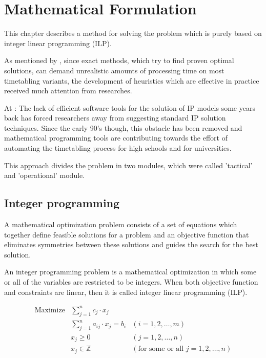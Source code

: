 \chapter{Mathematical Formulation}
\label{chap:mipformulation}



This chapter describes a method for solving the problem which is purely based on integer linear programming (ILP).

As mentioned by \cite{Haroldo2012}, since exact methods, which try to find proven optimal solutions, can demand unrealistic amounts of processing time on most timetabling variants, the development of heuristics which are effective in practice received much attention from researches.

At \cite{Birbas2009}: The lack of efficient software tools for the solution of IP models some years back has forced researchers away from suggesting standard IP solution techniques. Since the early 90's though, this obstacle has been removed and mathematical programming tools are contributing towards the effort of automating the timetabling process for high schools and for universities.

This approach divides the problem in two modules, which were called 'tactical' and 'operational' module.


\section{Integer programming}

A mathematical optimization problem consists of a set of equations which together define feasible solutions for a problem and an objective function that eliminates symmetries between these solutions and guides the search for the best solution.

An integer programming problem is a mathematical optimization in which some or all of the variables are restricted to be integers. When both objective function and constraints are linear, then it is called integer linear programming (ILP).

$$
\begin{array}{rll}
   \mbox{Maximize} & \sum\limits_{j=1}^n c_{j} \cdot x_{j} &
      \\ & \sum\limits_{j=1}^n a_{ij} \cdot x_{j} = b_{i} & (i = 1, 2, \ldots, m)
			\\ & x_{j} \ge 0 & (j = 1, 2, \ldots, n)
			\\ & x_{j} \in \mathbb{Z} & (\mbox{for some or all }j = 1, 2, \ldots , n)
\end{array}
$$

